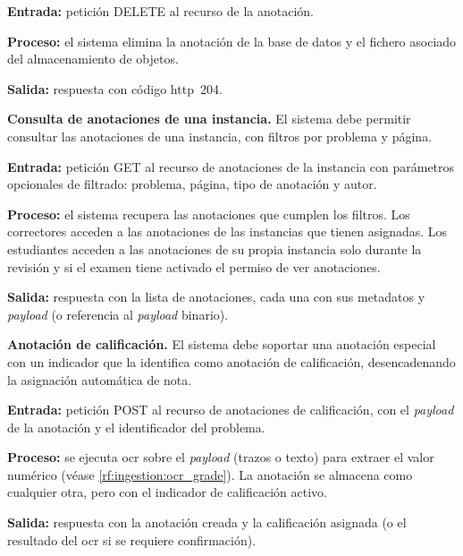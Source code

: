 \begin{functional}
    \textbf{Entrada:} petición DELETE al recurso de la anotación.

    \textbf{Proceso:} el sistema elimina la anotación de la base de datos y el fichero
    asociado del almacenamiento de objetos.

    \textbf{Salida:} respuesta con código \acs{http}~204.

    \item \textbf{Consulta de anotaciones de una instancia.}
    \label{rf:annotations:list}
    El sistema debe permitir consultar las anotaciones de una instancia, con filtros por
    problema y página.

    \textbf{Entrada:} petición GET al recurso de anotaciones de la instancia con parámetros
    opcionales de filtrado: problema, página, tipo de anotación y autor.

    \textbf{Proceso:} el sistema recupera las anotaciones que cumplen los filtros. Los
    correctores acceden a las anotaciones de las instancias que tienen asignadas. Los
    estudiantes acceden a las anotaciones de su propia instancia solo durante la revisión y
    si el examen tiene activado el permiso de ver anotaciones.

    \textbf{Salida:} respuesta con la lista de anotaciones, cada una con sus metadatos y
    \textit{payload} (o referencia al \textit{payload} binario).

    \item \textbf{Anotación de calificación.} \label{rf:annotations:grade_mark}
    El sistema debe soportar una anotación especial con un indicador que la identifica como
    anotación de calificación, desencadenando la asignación automática de nota.

    \textbf{Entrada:} petición POST al recurso de anotaciones de calificación, con el
    \textit{payload} de la anotación y el identificador del problema.

    \textbf{Proceso:} se ejecuta \acs{ocr} sobre el \textit{payload} (trazos o texto) para
    extraer el valor numérico (véase \cref{rf:ingestion:ocr_grade}). La anotación se
    almacena como cualquier otra, pero con el indicador de calificación activo.

    \textbf{Salida:} respuesta con la anotación creada y la calificación asignada (o el
    resultado del \acs{ocr} si se requiere confirmación).


\end{functional}
